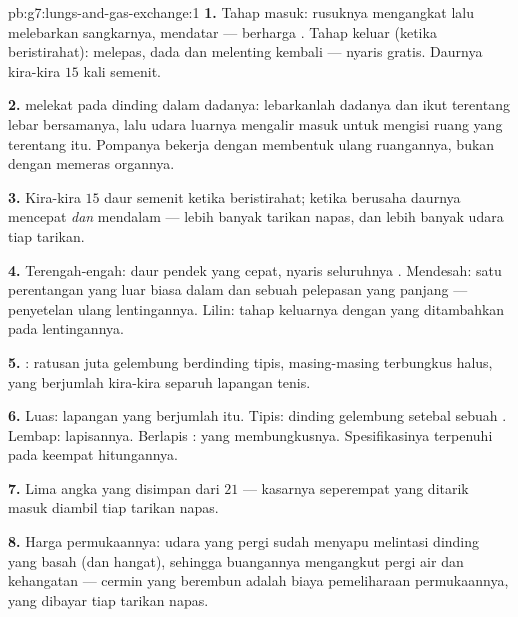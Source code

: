 \begin{solution}{pb:g7:lungs-and-gas-exchange:1}
\textbf{1.} Tahap masuk:  rusuknya mengangkat lalu melebarkan
sangkarnya,  mendatar --- berharga . Tahap keluar
(ketika beristirahat):  melepas, dada dan 
melenting kembali --- nyaris gratis. Daurnya kira-kira $15$ kali
semenit.

\textbf{2.}  melekat pada dinding dalam dadanya:
lebarkanlah dadanya dan  ikut terentang lebar bersamanya,
lalu udara luarnya mengalir masuk untuk mengisi ruang yang terentang
itu. Pompanya bekerja dengan membentuk ulang ruangannya, bukan dengan
memeras organnya.

\textbf{3.} Kira-kira $15$ daur semenit ketika beristirahat; ketika
berusaha daurnya mencepat \emph{dan} mendalam --- lebih banyak tarikan
napas, dan lebih banyak udara tiap tarikan.

\textbf{4.} Terengah-engah: daur pendek yang cepat, nyaris seluruhnya
. Mendesah: satu perentangan yang luar biasa dalam dan sebuah
pelepasan yang panjang --- penyetelan ulang lentingannya. Lilin: tahap
keluarnya dengan  yang ditambahkan pada lentingannya.

\textbf{5.} : ratusan juta gelembung berdinding tipis,
masing-masing terbungkus  halus, yang berjumlah kira-kira
separuh lapangan tenis.

\textbf{6.} Luas: lapangan yang berjumlah itu. Tipis: dinding
gelembung setebal sebuah . Lembap: lapisannya. Berlapis :
 yang membungkusnya. Spesifikasinya terpenuhi pada keempat
hitungannya.

\textbf{7.} Lima angka yang disimpan dari $21$ --- kasarnya seperempat
 yang ditarik masuk diambil tiap tarikan napas.

\textbf{8.} Harga  permukaannya: udara yang pergi sudah
menyapu melintasi dinding yang basah (dan hangat), sehingga buangannya
mengangkut pergi air dan kehangatan --- cermin yang berembun adalah
biaya pemeliharaan permukaannya, yang dibayar tiap tarikan napas.


\end{solution}
